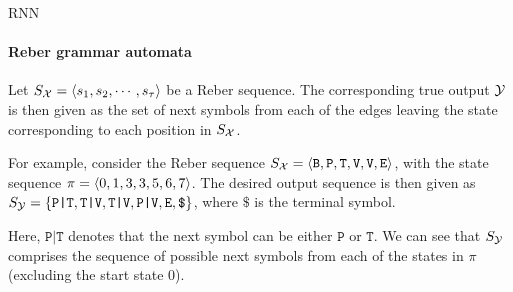 \begin{frame}{RNN}
\framesubtitle{Reber grammar automata}

\medskip

    Let $S_{\mathcal X} = \langle s_1, s_2, \cdots, s_{\tau} \rangle$ be a Reber
    sequence. The corresponding true output ${\mathcal Y}$ is then given as the
    set of next symbols from each of the edges leaving the state
    corresponding to each position in $S_{\mathcal X}$. 

\medskip

For example, consider the
    Reber sequence $S_{\mathcal X} = \langle \texttt{B}, \texttt{P}, \texttt{T},
    \texttt{V}, \texttt{V}, \texttt{E} \rangle$, with the state sequence $\pi =
    \langle 0,1,3,3,5,6,7 \rangle$. The desired output sequence is then given as
    $S_{\mathcal Y} = \{\texttt{P|T}, \texttt{T|V}, \texttt{T|V}, \texttt{P|V},
    \texttt{E}, \texttt{\$} \}$, where $\texttt{\$}$ is the terminal
    symbol. 


\medskip

    Here, $\texttt{P|T}$ denotes that the next symbol can be either
    $\texttt{P}$ or $\texttt{T}$.
    We can see that $S_{\mathcal Y}$ comprises the sequence of possible
    next symbols from each of the states in $\pi$ (excluding the start
    state $0$).
\end{frame}

